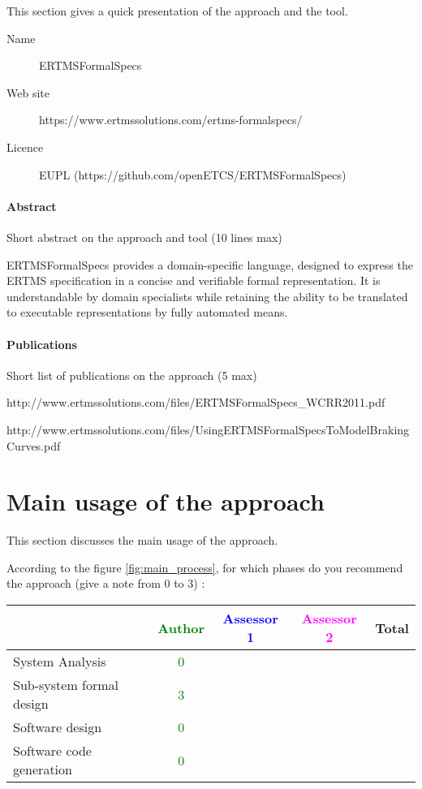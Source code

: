 This section gives a quick presentation of the approach and the tool.

\begin{description}
\item[Name] ERTMSFormalSpecs
\item[Web site] https://www.ertmssolutions.com/ertms-formalspecs/
\item[Licence] EUPL (https://github.com/openETCS/ERTMSFormalSpecs)
\end{description}

\paragraph{Abstract} Short abstract on the approach and tool (10 lines max)

ERTMSFormalSpecs provides a domain-specific language, designed to express the ERTMS specification in a concise and verifiable formal representation. It is understandable by domain specialists while retaining the ability to be translated to executable representations by fully automated means.
\paragraph{Publications} Short list of publications on the approach (5 max)

http://www.ertmssolutions.com/files/ERTMSFormalSpecs_WCRR2011.pdf

http://www.ertmssolutions.com/files/UsingERTMSFormalSpecsToModelBrakingCurves.pdf

\section{Main usage of the approach}
\label{main_usage}
This section discusses the main usage of the approach.

According to the figure \ref{fig:main_process}, for which phases do you recommend the approach (give a note from 0 to  3) :

\begin{tabular}{|l | c | c | c | c|}
\hline
& \textcolor{green}{Author} & \textcolor{blue}{Assessor 1} & \textcolor{magenta}{Assessor 2} & Total \\
\hline 
System Analysis & \textcolor{green}{0} & & &  \\
\hline
Sub-system formal design & \textcolor{green}{3} & & & \\
\hline
Software design & \textcolor{green}{0} & & & \\
\hline
Software code generation & \textcolor{green}{0} & & & \\
\hline
\end{tabular}

